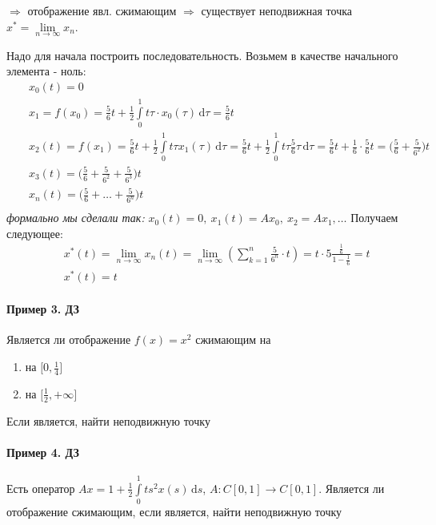 \documentclass{article}[12pt]
\renewcommand{\d}{\,\mathrm{d}}
\begin{document}
$\Rightarrow $ отображение явл. сжимающим $\Rightarrow $ существует неподвижная точка $x^{*}=\lim\limits_{n\rightarrow \infty}x_{n}$.
\par Надо для начала построить последовательность. Возьмем в качестве начального элемента - ноль:
\begin{eqnarray*}
    &&x_{0}(t)=0\\
    &&x_{1}=f(x_{0})=\frac{5}{6}t+\frac{1}{2}\int\limits_{0}^{1}t\tau\cdot
    x_{0}(\tau)\d{\tau}=\frac{5}{6}t\\
    &&x_{2}(t)=f(x_{1})=\frac{5}{6}t+\frac{1}{2}\int\limits_{0}^{1}t\tau
    x_{1}(\tau)\d{\tau}=\frac{5}{6}t+\frac{1}{2}\int\limits_{0}^{1}t\tau
    \frac{5}{6}\tau\d{\tau}
    =\frac{5}{6}t+\frac{1}{6}\cdot\frac{5}{6}t
    =\Big(\frac{5}{6}+\frac{5}{6^{2}}\Big)t\\
    &&x_{3}(t)=\Big(\frac{5}{6}+\frac{5}{6^{2}}+\frac{5}{6^{3}}\Big)t\\
    &&x_{n}(t)=\Big(\frac{5}{6}+\ldots+\frac{5}{6^{n}}\Big)t\\
\end{eqnarray*}
\textit{формально мы сделали так:} $x_{0}(t)=0,\ x_{1}(t)=Ax_{0},\ x_{2}=Ax_{1},\ldots$
Получаем следующее:
\begin{eqnarray*}
    &&x^{*}(t)=\lim\limits_{n\rightarrow \infty}x_{n}(t)
    =\lim\limits_{n\rightarrow \infty}
    \left(\sum\limits_{k=1}^{n}\frac{5}{6^{n}}\cdot t\right)
    = t\cdot 5\frac{\frac{1}{6}}{1-\frac{1}{6}}=t\\
    &&x^{*}(t)=t
\end{eqnarray*}

\paragraph{Пример 3. ДЗ}
Является ли отображение $f(x)=x^{2}$ сжимающим на
\begin{enumerate}
    \item на $\Big[0,\frac{1}{4}\Big]$
    \item на $\Big[\frac{1}{2},+\infty\Big]$
\end{enumerate}
Если является, найти неподвижную точку

\paragraph{Пример 4. ДЗ}
Есть оператор $Ax=1+\frac{1}{2}\int\limits_{0}^{1}ts^{2}x(s)\d{s}$, $A:C[0,1]\to C[0,1]$.
Является ли отображение сжимающим, если является, найти неподвижную точку
\end{document}
